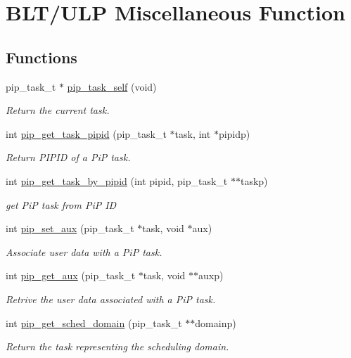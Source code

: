 \hypertarget{group__ulp-6-misc}{\section{B\-L\-T/\-U\-L\-P Miscellaneous Function}
\label{group__ulp-6-misc}
}
\subsection*{Functions}
\begin{DoxyCompactItemize}
\item 
pip\-\_\-task\-\_\-t $\ast$ \hyperlink{group__ulp-6-misc_gaf09a1abfd580696c74d4aa7be8255ad0}{pip\-\_\-task\-\_\-self} (void)
\begin{DoxyCompactList}\small\item\em Return the current task. \end{DoxyCompactList}\item 
int \hyperlink{group__ulp-6-misc_ga14a1b03ec6564885a5dd97dbc27167aa}{pip\-\_\-get\-\_\-task\-\_\-pipid} (pip\-\_\-task\-\_\-t $\ast$task, int $\ast$pipidp)
\begin{DoxyCompactList}\small\item\em Return P\-I\-P\-I\-D of a Pi\-P task. \end{DoxyCompactList}\item 
int \hyperlink{group__ulp-6-misc_ga147decca4226959d822b73b7c31a4465}{pip\-\_\-get\-\_\-task\-\_\-by\-\_\-pipid} (int pipid, pip\-\_\-task\-\_\-t $\ast$$\ast$taskp)
\begin{DoxyCompactList}\small\item\em get Pi\-P task from Pi\-P I\-D \end{DoxyCompactList}\item 
int \hyperlink{group__ulp-6-misc_gacfd984207deedf86edddbb72c5d4e883}{pip\-\_\-set\-\_\-aux} (pip\-\_\-task\-\_\-t $\ast$task, void $\ast$aux)
\begin{DoxyCompactList}\small\item\em Associate user data with a Pi\-P task. \end{DoxyCompactList}\item 
int \hyperlink{group__ulp-6-misc_ga8bf51911ca0b18340b29fae90ab59b03}{pip\-\_\-get\-\_\-aux} (pip\-\_\-task\-\_\-t $\ast$task, void $\ast$$\ast$auxp)
\begin{DoxyCompactList}\small\item\em Retrive the user data associated with a Pi\-P task. \end{DoxyCompactList}\item 
int \hyperlink{group__ulp-6-misc_ga32119e3a41a4073b52ade76bf87a5589}{pip\-\_\-get\-\_\-sched\-\_\-domain} (pip\-\_\-task\-\_\-t $\ast$$\ast$domainp)
\begin{DoxyCompactList}\small\item\em Return the task representing the scheduling domain. \end{DoxyCompactList}\end{DoxyCompactItemize}


